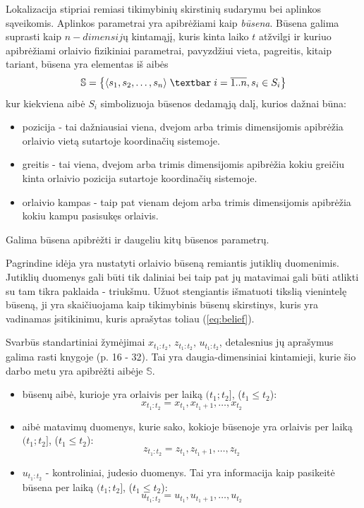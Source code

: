 \documentclass[a4paper,12pt]{article}
\begin{document}
		Lokalizacija stipriai remiasi tikimybinių skirstinių sudarymu bei aplinkos sąveikomis.		
		Aplinkos parametrai yra apibrėžiami kaip \textit{būsena}. Būsena galima suprasti kaip $n-dimensijų$ kintamąjį, kuris kinta laiko $t$ atžvilgi ir kuriuo apibrėžiami orlaivio fizikiniai parametrai, pavyzdžiui vieta, pagreitis, kitaip tariant, būsena yra elementas iš aibės 
		\begin{equation}
			\label{eq:statesSet}
			\mathbb{S} = \left\{ \langle s_1, s_2,\dots, s_n \rangle \;\textbar\; i= \overline{1..n}, s_i \in S_i \right\}
		\end{equation}
		kur kiekviena aibė $S_i$ simbolizuoja būsenos dedamąją dalį, kurios dažnai būna:
		\begin{itemize}
			\item pozicija - tai dažniausiai viena, dvejom arba trimis dimensijomis apibrėžia orlaivio vietą sutartoje koordinačių sistemoje.
			\item greitis - tai viena, dvejom arba trimis dimensijomis apibrėžia kokiu greičiu kinta orlaivio pozicija sutartoje koordinačių sistemoje.
			\item orlaivio kampas - taip pat vienam dejom arba trimis dimensijomis apibrėžia kokiu kampu pasisukęs orlaivis.
		\end{itemize}
		Galima būsena apibrėžti ir daugeliu kitų būsenos parametrų.
		
		Pagrindine idėja yra nustatyti orlaivio būseną remiantis jutiklių duomenimis. Jutiklių duomenys gali būti tik daliniai bei taip pat jų matavimai gali būti atlikti su tam tikra paklaida - triukšmu. Užuot stengiantis išmatuoti tikslią vienintelę būseną, ji yra skaičiuojama kaip tikimybinis būsenų skirstinys, kuris yra vadinamas įsitikinimu, kuris aprašytas toliau (\ref{eq:belief}).
		
		Svarbūs standartiniai žymėjimai $x_{t_1:t_2},\, z_{t_1:t_2},\, u_{t_1:t_2}$, detalesnius jų aprašymus galima rasti knygoje  \cite{thrun2005probabilistic}(p. 16 - 32). Tai yra daugia-dimensiniai kintamieji, kurie šio darbo metu yra apibrėžti aibėje $\mathbb{S}$.

		\begin{itemize}
			\item būsenų aibė, kurioje yra orlaivis per laiką $(t_1;t_2]$, ($t_1 \leq t_2$):
				\begin{equation}
					x_{t_1:t_2} = x_{t_1}, x_{t_1+1},\dots,x_{t_2} 
				\end{equation}
			\item aibė matavimų duomenys, kurie sako, kokioje būsenoje yra orlaivis per laiką $(t_1;t_2]$, ($t_1 \leq t_2$):
				\begin{equation}
				z_{t_1:t_2} = z_{t_1}, z_{t_1+1},\dots,z_{t_2} 
				\end{equation}
			\item $u_{t_1:t_2}$ - kontroliniai, judesio duomenys. Tai yra informacija kaip pasikeitė būsena per laiką $(t_1;t_2]$, ($t_1 \leq t_2$):
				\begin{equation}
				u_{t_1:t_2} = u_{t_1}, u_{t_1+1},\dots,u_{t_2} 
				\end{equation}
		\end{itemize}	
\end{document}
